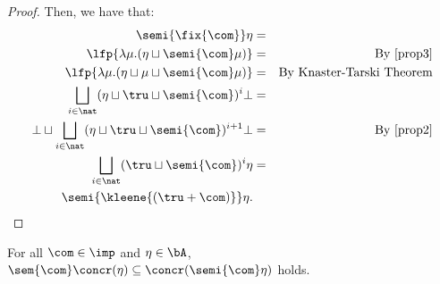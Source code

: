 \begin{proof}
  Then, we have that:
  \begin{align*}
    \semi{\fix{\com}} \eta & = \\
    \lfp{\lambda \mu. (\eta \sqcup \semi{\com} \mu)} & = &  \text{By \eqref{prop3}}\\
    \lfp{\lambda \mu. (\eta \sqcup \mu \sqcup \semi{\com} \mu)} & = & \text{By Knaster-Tarski Theorem} \\
    \bigsqcup_{i \in \nat} (\eta \sqcup \tru \sqcup \semi{\com})^i \bot & = \\
    \bot \sqcup \bigsqcup_{i \in \nat} (\eta \sqcup \tru \sqcup \semi{\com})^{i+1} \bot & = & \text{By \eqref{prop2}}\\
    \bigsqcup_{i \in \nat} (\tru \sqcup \semi{\com})^{i} \eta & = \\
    \semi{\kleene{(\tru + \com)}} \eta. &
  \end{align*}  
\end{proof}


\begin{theorem}
  For all \(\com \in \imp\) and \(\eta\in \bA\),
  \(\sem{\com}\concr(\eta) \subseteq \concr(\semi{\com}\eta)\) holds.
\end{theorem}

